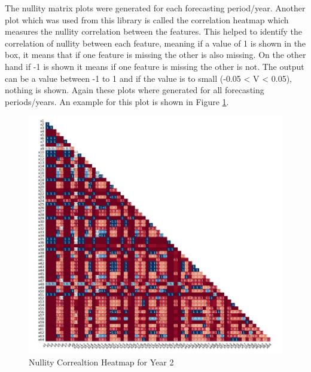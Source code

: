 \noindent The nullity matrix plots were generated for each forecasting period/year. Another plot which was used from this library is called the correlation heatmap which measures the nullity correlation between the features. This helped to identify the correlation of nullity between each feature, meaning if a value of 1 is shown in the box, it means that if one feature is missing the other is also missing. On the other hand if -1 is shown it means if one feature is missing the other is not. The output can be a value between -1 to 1 and if the value is to small (-0.05 < V < 0.05), nothing is shown. Again these plots where generated for all forecasting periods/years. An example for this plot is shown in Figure \ref{fig:nullity_heatmap}.

\begin{figure}[H]
\centering
  \includegraphics[scale = .6]{imgs/nullity_heatmap.JPG}
  \caption{Nullity Correaltion Heatmap for Year 2 }
  \label{fig:nullity_heatmap}
\end{figure}


